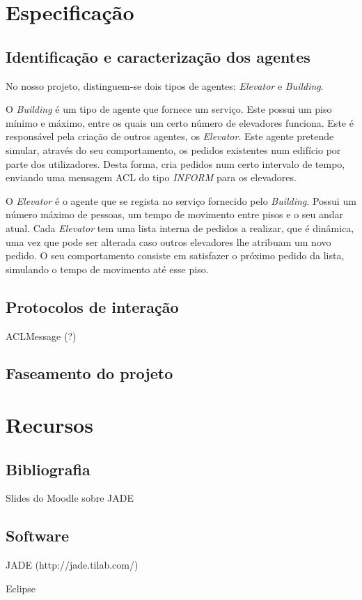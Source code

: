 \documentclass[a4paper]{article}
\begin{document}
\newpage

\section{Especificação}

\subsection{Identificação e caracterização dos agentes} 

No nosso projeto, distinguem-se dois tipos de agentes: \textit{Elevator} e \textit{Building}.

O \textit{Building} é um tipo de agente que fornece um serviço. Este possui um piso mínimo e máximo, entre os quais um certo número de elevadores funciona. Este é responsável pela criação de outros agentes, os \textit{Elevator}. Este agente pretende simular, através do seu comportamento, os pedidos existentes num edifício por parte dos utilizadores. Desta forma, cria pedidos num certo intervalo de tempo, enviando uma mensagem ACL do tipo \textit{INFORM} para os elevadores.

O \textit{Elevator} é o agente que se regista no serviço fornecido pelo \textit{Building}. Possui um número máximo de pessoas, um tempo de movimento entre pisos e o seu andar atual. Cada \textit{Elevator} tem uma lista interna de pedidos a realizar, que é dinâmica, uma vez que pode ser alterada caso outros elevadores lhe atribuam um novo pedido. O seu comportamento consiste em satisfazer o próximo pedido da lista, simulando o tempo de movimento até esse piso.

\subsection{Protocolos de interação} 

ACLMessage (?)

\subsection{Faseamento do projeto} 

\newpage

\section{Recursos}

\subsection{Bibliografia} 

Slides do Moodle sobre JADE

\subsection{Software} 

JADE (http://jade.tilab.com/)

Eclipse
\end{document}
